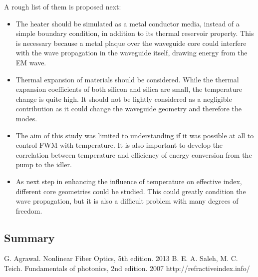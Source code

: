 \documentclass[12pt,a4paper,twoside]{article}
\begin{document}
A rough list of them is proposed next:
\begin{itemize}
\item	The heater should be simulated as a metal conductor media, instead of a simple boundary condition, in addition to its thermal reservoir property. This is necessary because a metal plaque over the waveguide core could interfere with the wave propagation in the waveguide itself, drawing energy from the EM wave.

\item	Thermal expansion of materials should be considered.
While the thermal expansion coefficients of both silicon and silica are small, the temperature change is quite high.
It should not be lightly considered as a negligible contribution as it could change the waveguide geometry and therefore the modes.

\item	The aim of this study was limited to understanding if it was possible at all to control FWM with temperature.
It is also important to develop the correlation between temperature and efficiency of energy conversion from the pump to the idler.

\item	As next step in enhancing the influence of temperature on effective index, different core geometries could be studied.
This could greatly condition the wave propagation, but it is also a difficult problem with many degrees of freedom.

\end{itemize}

\subsection{Summary}

\cleardoublepage
\begin{thebibliography}{9}
 G. Agrawal. Nonlinear Fiber Optics, 5th edition. 2013
 B. E. A. Saleh, M. C. Teich. Fundamentals of photonics, 2nd edition. 2007
 http://refractiveindex.info/
\end{thebibliography}
\end{document}
